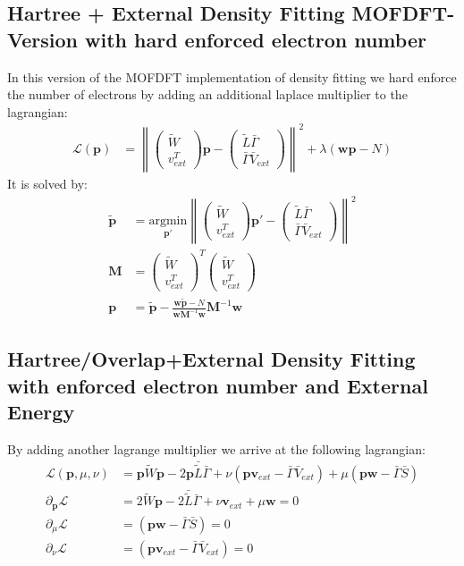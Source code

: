\subsection{Hartree + External Density Fitting MOFDFT-Version with hard enforced electron number}
In this version of the MOFDFT implementation of density fitting we hard enforce the number of electrons by adding an additional laplace multiplier to the lagrangian:
\begin{align}
\mathcal{L}(\mathbf{p}) &= \left\lVert\left(\begin{array}{c}\tilde{W}\\v_{ext}^T\end{array}\right) \mathbf{p} - \left(\begin{array}{c}\tilde{L} \bar{\Gamma} \\ \bar{\Gamma}\bar{V}_{ext}\end{array}\right)\right\rVert^2 + \lambda (\mathbf{w}\mathbf{p}-N)
\end{align}
It is solved by:
\begin{align}
\mathbf{\tilde{p}} &= \underset{\mathbf{p'}}{\text{argmin}}
 \left\lVert\left(\begin{array}{c}\tilde{W}\\v_{ext}^T\end{array}\right) \mathbf{p'} - \left(\begin{array}{c}\tilde{L} \bar{\Gamma} \\ \bar{\Gamma}\bar{V}_{ext}\end{array}\right)\right\rVert^2\\
\mathbf{M} &= \left(\begin{array}{c}\tilde{W}\\v_{ext}^T\end{array}\right)^T\left(\begin{array}{c}\tilde{W}\\v_{ext}^T\end{array}\right)\\
\mathbf{p} &= \mathbf{\tilde{p}} - \frac{\mathbf{w\tilde{p}}-N}{\mathbf{w}\mathbf{M}^{-1}\mathbf{w}}\mathbf{M}^{-1}\mathbf{w}
\end{align}
\subsection{Hartree/Overlap+External Density Fitting with enforced electron number and External Energy}
By adding another lagrange multiplier we arrive at the following lagrangian:
\begin{align}
\mathcal{L}(\mathbf{p},\mu,\nu) &= \mathbf{p} \tilde{W} \mathbf{p} - 2 \mathbf{p}\bar {\tilde L} \bar\Gamma + \nu(\mathbf{p}\mathbf{v}_{ext}-\bar\Gamma \bar{V}_{ext})+\mu(\mathbf{p}\mathbf{w}-\bar\Gamma\bar S)\\
\partial_{\mathbf p}\mathcal L&= 2\tilde{W} \mathbf{p}- 2 \bar {\tilde L} \bar\Gamma + \nu\mathbf{v}_{ext}+\mu \mathbf{w}= 0\\
\partial_\mu\mathcal{L}&= (\mathbf{p}\mathbf{w}-\bar\Gamma\bar S)=0\\
\partial_\nu\mathcal{L}&= (\mathbf{p}\mathbf{v}_{ext}-\bar\Gamma \bar{V}_{ext})=0\\
\end{align}

